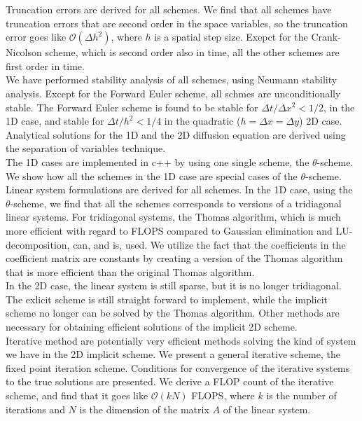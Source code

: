 \documentclass{article}
\begin{document}
Truncation errors are derived for all schemes. We find that all schemes have truncation errors that are second order in the space variables, so the truncation error goes like $\mathcal{O}(\Delta h^2)$, where $h$ is a spatial step size. Exepct for the Crank-Nicolson scheme, which is second order also in time, all the other schemes are first order in time.\\

We have performed stability analysis of all schemes, using Neumann stability analysis. Except for the Forward Euler scheme, all schmes are unconditionally stable. The Forward Euler scheme is found to be stable for $\Delta t/\Delta x^2 < 1/2$, in the 1D case, and stable for $\Delta t /h^2 < 1/4$ in the quadratic ($h = \Delta x = \Delta y$) 2D case.\\

Analytical solutions for the 1D and the 2D diffusion equation are derived using the separation of variables technique. \\

The 1D cases are implemented in c++ by using one single scheme, the $\theta$-scheme. We show how all the schemes in the 1D case are special cases of the $\theta$-scheme.\\

Linear system formulations are derived for all schemes. In the 1D case, using the $\theta$-scheme, we find that all the schemes corresponds to versions of a tridiagonal linear systems. For tridiagonal systems, the Thomas algorithm, which is much more efficient with regard to FLOPS compared to Gaussian elimination and LU-decomposition, can, and is, used. We utilize the fact that the coefficients in the coefficient matrix are constants by creating a version of the Thomas algorithm that is more efficient than the original Thomas algorithm. \\

In the 2D case, the linear system is still sparse, but it is no longer tridiagonal. The exlicit scheme is still straight forward to implement, while the implicit scheme no longer can be solved by the Thomas algorithm. Other methods are necessary for obtaining efficient solutions of the implicit 2D scheme.\\ 

Iterative method are potentially very efficient methods solving the kind of system we have in the 2D implicit scheme. We present a general iterative scheme, the fixed point iteration scheme. Conditions for convergence of the iterative systems to the true solutions are presented. We derive a FLOP count of the iterative scheme, and find that it goes like $\mathcal{O}(k N)$ FLOPS, where $k$ is the number of iterations and $N$ is the dimension of the matrix $A$ of the linear system. \\
\end{document}
